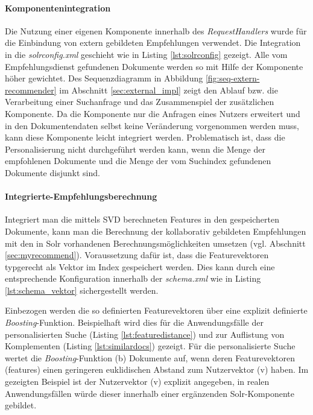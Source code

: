 \paragraph{Komponentenintegration}  Die Nutzung einer eigenen Komponente innerhalb des \textit{RequestHandlers} wurde für die Einbindung von extern gebildeten Empfehlungen verwendet. Die Integration in die \textit{solrconfig.xml} geschieht wie in Listing \ref{lst:solrconfig} gezeigt. Alle vom Empfehlungsdienst gefundenen Dokumente werden so mit Hilfe der Komponente höher gewichtet. Des Sequenzdiagramm in Abbildung \ref{fig:seq-extern-recommender} im Abschnitt \ref{sec:external_impl} zeigt den Ablauf bzw. die Verarbeitung einer Suchanfrage und das Zusammenspiel der zusätzlichen Komponente. Da die Komponente nur die Anfragen eines Nutzers erweitert und in den Dokumentendaten selbst keine Veränderung vorgenommen werden muss, kann diese Komponente  leicht integriert werden. Problematisch ist, dass die Personalisierung nicht durchgeführt werden kann, wenn die Menge der empfohlenen Dokumente und die Menge der vom Suchindex gefundenen Dokumente disjunkt sind.



\paragraph{Integrierte-Empfehlungsberechnung} Integriert man die mittels SVD berechneten Features in den gespeicherten Dokumente, kann man die Berechnung der kollaborativ gebildeten Empfehlungen mit den in Solr vorhandenen Berechnungsmöglichkeiten umsetzen (vgl.  Abschnitt \ref{sec:myrecommend}). Voraussetzung dafür ist, dass die Featurevektoren typgerecht als Vektor im Index gespeichert werden. Dies kann durch eine entsprechende Konfiguration innerhalb der \textit{schema.xml} wie in Listing \ref{lst:schema_vektor} sichergestellt werden.



Einbezogen werden die so definierten Featurevektoren über eine explizit definierte \textit{Boosting}-Funktion. Beispielhaft wird dies für die Anwendungsfälle der personalisierten Suche (Listing \ref{lst:featuredistance}) und zur Auflistung von Komplementen (Listing \ref{lst:similardocs}) gezeigt. Für die personalisierte Suche wertet die \textit{Boosting}-Funktion (b) Dokumente auf, wenn deren Featurevektoren (features) einen geringeren euklidischen Abstand zum Nutzervektor (v) haben. Im gezeigten Beispiel ist der Nutzervektor (v) explizit angegeben, in realen Anwendungsfällen würde dieser innerhalb einer  ergänzenden Solr-Komponente gebildet.

